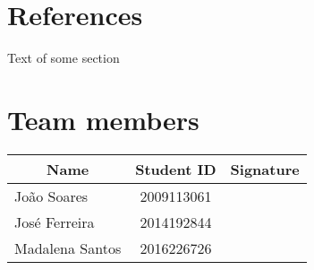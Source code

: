 \documentclass{article}
\begin{document}
\section{References}

\qquad Text of some section

\section*{Team members}

\begin{tabularx}{\linewidth}{ l c c }
\multicolumn{1}{c}{Name} & Student ID & Signature \\
\hline
João Soares & 2009113061 &   \\
\hline
José Ferreira & 2014192844 &  \\
\hline
Madalena Santos & 2016226726 & \\
\hline
\end{tabularx}
\end{document}
